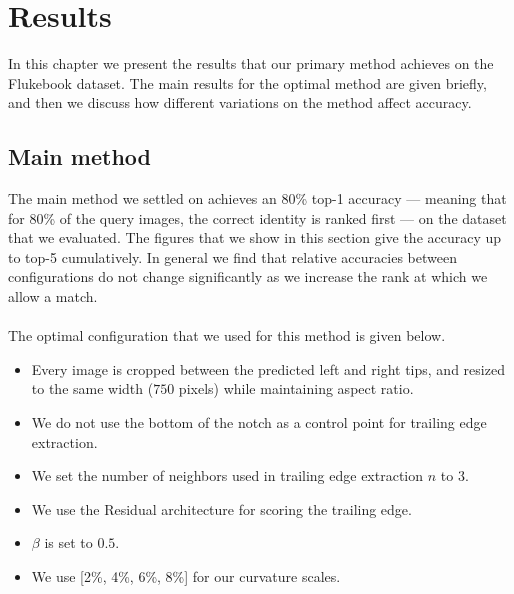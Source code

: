 

\chapter{Results} \label{sec:results}

In this chapter we present the results that our primary method achieves on the Flukebook dataset.
The main results for the optimal method are given briefly, and then we discuss how different variations on the method affect accuracy.

\section{Main method}

The main method we settled on achieves an 80\% top-1 accuracy --- meaning that for 80\% of the query images, the correct identity is ranked first --- on the dataset that we evaluated.  
The figures that we show in this section give the accuracy up to top-5 cumulatively.
In general we find that relative accuracies between configurations do not change significantly as we increase the rank at which we allow a match.
\\\\
The optimal configuration that we used for this method is given below.
\begin{itemize}
\item Every image is cropped between the predicted left and right tips, and resized to the same width ($750$ pixels) while maintaining aspect ratio. 
\item We do not use the bottom of the notch as a control point for trailing edge extraction.
\item We set the number of neighbors used in trailing edge extraction $n$ to $3$.
\item We use the Residual architecture for scoring the trailing edge.
\item $\beta$ is set to $0.5$.
\item We use [2\%, 4\%, 6\%, 8\%] for our curvature scales.
\end{itemize}

